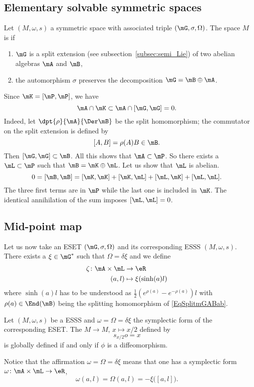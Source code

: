 \subsection{Elementary solvable symmetric spaces}

Let $(M,\omega,s)$ a symmetric space with associated triple $(\mG,\sigma,\Omega)$. The space $M$ is  if

\begin{enumerate}
	\item $\mG$ is a split extension  (see subsection~\ref{subsec:semi_Lie}) of two abelian algebras $\mA$ and $\mB$,
	\item the automorphism $\sigma$ preserves the decomposition $\mG=\mB\oplus\mA$.
\end{enumerate}
Since $\mK=[\mP,\mP]$, we have
\[
	\mA\cap\mK\subset\mA\cap[\mG,\mG]=0.
\]
Indeed, let $\dpt{\rho}{\mA}{\Der\mB}$ be the split homomorphism; the commutator on the split extension is defined by
\[
	[A,B]=\rho(A)B\in\mB.
\]
Then $[\mG,\mG]\subset\mB$. All this shows that $\mA\subset\mP$. So there exists a $\mL\subset\mP$ such that $\mB=\mK\oplus\mL$. Let us show that $\mL$ is abelian.
\[
	0=[\mB,\mB]=[\mK,\mK]+[\mK,\mL]+[\mL,\mK]+[\mL,\mL].
\]
The three first terms are in $\mP$ while the last one is included in $\mK$. The identical annihilation of the sum imposes $[\mL,\mL]=0$.

\subsection{Mid-point map}

Let us now take an ESET $(\mG,\sigma,\Omega)$ and its corresponding ESSS $(M,\omega,s)$. There exists a $\xi\in\mG^*$ such that $\Omega=\delta\xi$ and we define
\begin{equation}
	\begin{aligned}
		\zeta\colon \mA\times\mL & \to \eR                \\
		(a,l)                    & \mapsto \xi(\sinh(a)l)
	\end{aligned}
\end{equation}
where $\sinh(a)l$ has to be understood as $\frac{ 1 }{2}( e^{\rho(a)}- e^{-\rho(a)})l$ with $\rho(a)\in\End(\mB)$ being the splitting homomorphism of \eqref{EqSplitmGABab}.
\begin{proposition}
	Let $(M,\omega,s)$ be a ESSS and $\omega=\Omega=\delta\xi$ the symplectic form of the corresponding ESET. The  $M\to M$, $x\mapsto x/2$ defined by
	\[
		s_{x/2}o=x
	\]
	is globally defined if and only if $\phi$ is a diffeomorphism.
\end{proposition}
Notice that the affirmation $\omega=\Omega=\delta\xi$ means that one has a symplectic form $\omega\colon \mA\times\mL\to \eR$,
\[
	\omega(a,l)=\Omega(a,l)=-\xi\big( [a,l] \big).
\]

